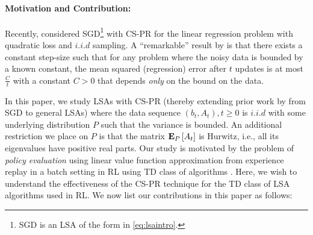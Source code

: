 \paragraph{Motivation and Contribution:} Recently, \citet{bach} considered SGD\footnote{SGD is an LSA of the form in \eqref{eq:lsaintro}.} with CS-PR for the linear regression problem with quadratic loss and $i.i.d$ sampling. A ``remarkable'' result by \citet{bach} is that there exists a constant step-size such that for any problem where the noisy data is bounded by a known constant, the mean squared (regression) error after $t$ updates is at most $\frac{C}{t}$ with a constant $C>0$ that depends \emph{only} on the bound on the data.\par{}
In this paper, we study LSAs with CS-PR (thereby extending prior work by \citet{bach} from SGD to general LSAs) where the data sequence $(b_t,A_t),t\geq 0$ is $i.i.d$ with some underlying distribution $P$ such that the variance is bounded. An additional restriction we place on $P$ is that the matrix $\mathbf{E}_P\left[A_t\right]$ is Hurwitz, i.e., all its eigenvalues have positive real parts.
Our study is motivated by the problem of \emph{policy evaluation} \cite{dann} using linear value function approximation from experience replay \cite{lin} in a batch setting \cite{lange} in RL using TD class  of algorithms \cite{sutton,konda-tsitsiklis,gtd,gtd2,gtdmp}. Here, we wish to understand the effectiveness of the CS-PR technique for the TD class of LSA algorithms used in RL.
We now list our contributions in this paper as follows:
